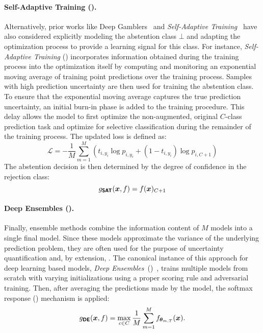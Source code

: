  \paragraph{Self-Adaptive Training (\sat).}
 Alternatively, prior works like Deep Gamblers~\citep{liu2019deep} and \emph{Self-Adaptive Training}~\citep{huang2020self} have also considered explicitly modeling the abstention class $\bot$ and adapting the optimization process to provide a learning signal for this class. For instance, \emph{Self-Adaptive Training} (\sat) incorporates information obtained during the training process into the optimization itself by computing and monitoring an exponential moving average of training point predictions over the training process. Samples with high prediction uncertainty are then used for training the abstention class. To ensure that the exponential moving average captures the true prediction uncertainty, an initial burn-in phase is added to the training procedure. This delay allows the model to first optimize the non-augmented, \ie original $C$-class prediction task and optimize for selective classification during the remainder of the training process. The updated loss is defined as:
 \begin{equation}
 	\mathcal{L} = -\frac{1}{M}\sum_{m=1}^{M} \left ( t_{i,y_i}\log p_{i,y_i} + (1-t_{i,y_i})\log p_{i,C+1} \right )
 \end{equation}
The abstention decision is then determined by the degree of confidence in the rejection class:
\begin{equation}
	g_{\textbf{\sffamily SAT}}(\bm{x}, f) = f(\bm{x})_{C+1}
\end{equation}

 \paragraph{Deep Ensembles (\de).}
 Finally, ensemble methods combine the information content of $M$ models into a single final model. Since these models approximate the variance of the underlying prediction problem, they are often used for the purpose of uncertainty quantification and, by extension, \selp. The canonical instance of this approach for deep learning based models, \emph{Deep Ensembles}~(\de)~\citep{lakshminarayanan2017simple}, trains multiple models from scratch with varying initializations using a proper scoring rule and adversarial training. Then, after averaging the predictions made by the model, the softmax response (\sr) mechanism is applied:
 \begin{equation}
 	g_{\textbf{\sffamily DE}}(\bm{x}, f) = \max_{c \in C} \frac{1}{M} \sum_{m=1}^{M} f_{\bm{\theta}_{m,T}}(\bm{x}).
 \end{equation}
 
